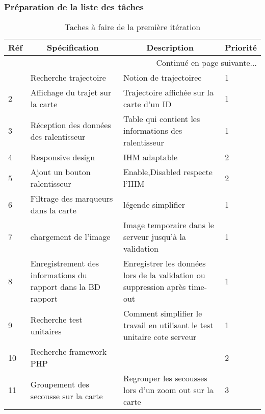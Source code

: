   \subsubsection{Préparation de la liste des tâches}
 \begin{center}
    \footnotesize
    \begin{longtable}{| p{1cm} | p{5cm} | p{7cm} | p{1cm} |}
        \caption{Taches à faire de la première itération}
        \label{tab:sprint2-backlog} \\

 \hline
 \multicolumn{1}{|c}{\textbf{Réf}} &
 \multicolumn{1}{|c}{\textbf{Spécification}} &
 \multicolumn{1}{|c}{\textbf{Description}} &
 \multicolumn{1}{|c|}{\textbf{Priorité}} \\ \hline
 \endhead

 \hline \multicolumn{4}{|r|}{{Continué en page suivante$\dotsc$}} \\ \hline
 \endfoot

 \hline \hline
 \endlastfoot

\hline
1 & Recherche trajectoire & Notion de trajectoirec & 1 \\ \hline
2 & Affichage du trajet sur la carte&Trajectoire affichée sur la carte d'un ID  & 1 \\ \hline
3 &Réception des données des ralentisseur &Table qui contient les informations des ralentisseur & 1 \\ \hline
4&Responsive design& IHM adaptable & 2 \\ \hline
5 & Ajout un bouton ralentisseur &Enable,Disabled respecte l'IHM  & 2 \\ \hline
6 & Filtrage des marqueurs dans la carte & légende simplifier & 1 \\ \hline
7 & chargement de l'image & Image temporaire dans le serveur jusqu'à la validation & 1 \\ \hline
8 & Enregistrement des informations du rapport dans la BD rapport& Enregistrer les données lors de la validation ou suppression après time-out & 1 \\ \hline
9 & Recherche test unitaires & Comment simplifier le travail en utilisant le test unitaire cote serveur  & 1 \\ \hline
10 & Recherche framework PHP & & 2 \\ \hline 
11 &Groupement des secousse sur la carte & Regrouper les secousses lors d'un zoom out sur la carte & 3 \\ \hline
\end{longtable}
\end{center}


